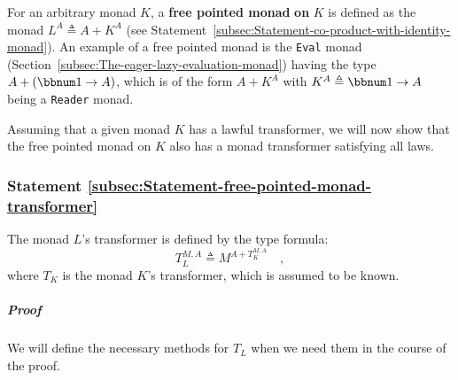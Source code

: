 For an arbitrary monad $K$, a \textbf{free pointed monad} \textbf{on}
$K$ is defined as the monad $L^{A}\triangleq A+K^{A}$ (see Statement~\ref{subsec:Statement-co-product-with-identity-monad}).
An example of a free pointed monad is the \lstinline!Eval! monad
(Section~\ref{subsec:The-eager-lazy-evaluation-monad}) having the
type $A+(\bbnum 1\rightarrow A)$, which is of the form $A+K^{A}$
with $K^{A}\triangleq\bbnum 1\rightarrow A$ being a \lstinline!Reader!
monad. 

Assuming that a given monad $K$ has a lawful transformer, we will
now show that the free pointed monad on $K$ also has a monad transformer
satisfying all laws.

\subsubsection{Statement \label{subsec:Statement-free-pointed-monad-transformer}\ref{subsec:Statement-free-pointed-monad-transformer}}

The monad $L$\textsf{'}s transformer is defined by the type formula:
\[
T_{L}^{M,A}\triangleq M^{A+T_{K}^{M,A}}\quad,
\]
where $T_{K}$ is the monad $K$\textsf{'}s transformer, which is assumed to
be known. 

\subparagraph{Proof}

We will define the necessary methods for $T_{L}$ when we need them
in the course of the proof.

